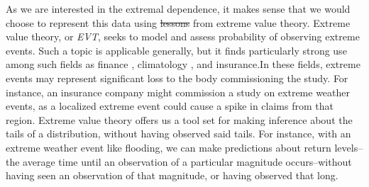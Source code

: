 As we are interested in the extremal dependence, it makes sense that we would choose to represent
  this data using \st{lessons}  from extreme value theory.  Extreme value theory, or \emph{EVT}, seeks
  to model and assess probability of observing extreme events.  Such a topic is applicable
  generally, but it finds particularly strong use among such fields as finance \citep{allen2013},
  climatology \citep{trepanier2018}, and insurance.\findcite  In these fields, extreme events may
  represent significant loss to the body commissioning the study.  For instance, an insurance
  company might commission a study on extreme weather events, as a localized extreme event could
  cause a spike in claims from that region.  Extreme value theory offers us a tool set for making
  inference about the tails of a distribution, without having observed said tails.  For instance,
  with an extreme weather event like flooding, we can make predictions about return levels--the
  average time until an observation of a particular magnitude occurs--without having seen an
  observation of that magnitude, or having observed that long.

